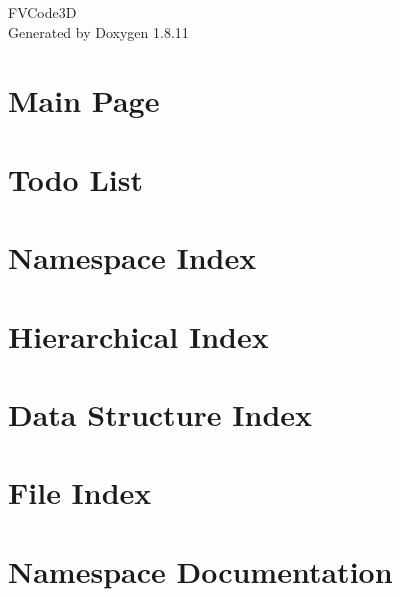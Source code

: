 \documentclass[twoside]{book}
\newcommand{\+}{\discretionary{\mbox{\scriptsize$\hookleftarrow$}}{}{}}
\newcommand{\clearemptydoublepage}{%
  \newpage{\pagestyle{empty}\cleardoublepage}%
}
\begin{document}
\hypersetup{pageanchor=false,
             bookmarksnumbered=true,
             pdfencoding=unicode
            }
\begin{titlepage}
\vspace*{7cm}
\begin{center}%
{\Large F\+V\+Code3D }\\
\vspace*{1cm}
{\large Generated by Doxygen 1.8.11}\\
\end{center}
\end{titlepage}
\clearemptydoublepage
\tableofcontents
\clearemptydoublepage
{}
\hypersetup{pageanchor=true}

\chapter{Main Page}
\label{index}\hypertarget{index}{}
\chapter{Todo List}
\label{todo}
\hypertarget{todo}{}

\chapter{Namespace Index}

\chapter{Hierarchical Index}

\chapter{Data Structure Index}

\chapter{File Index}

\chapter{Namespace Documentation}


\end{document}
